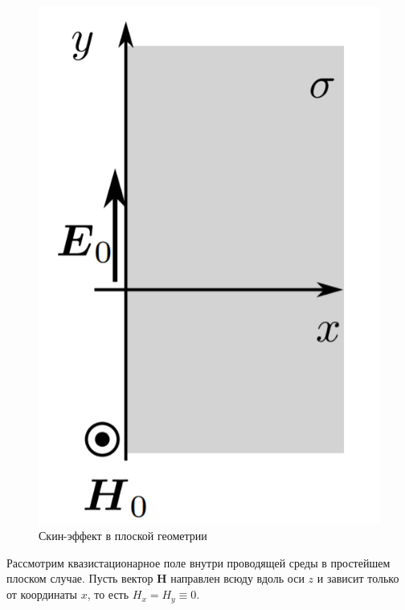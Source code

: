 	\begin{figure}
		\vspace{-20pt}
		\begin{center}
			\includegraphics[height=0.2\textheight]{images/Skin1.png}
		\end{center}
		\vspace{-20pt}
		\caption{Скин-эффект в плоской геометрии}
		\vspace{20pt}
	\end{figure}

	Рассмотрим квазистационарное поле внутри проводящей среды в простейшем плоском случае. Пусть вектор $\boldsymbol{H}$ направлен всюду вдоль оси $z$ и зависит только от координаты $x$, то есть $H_x = H_y \equiv 0$.
	
